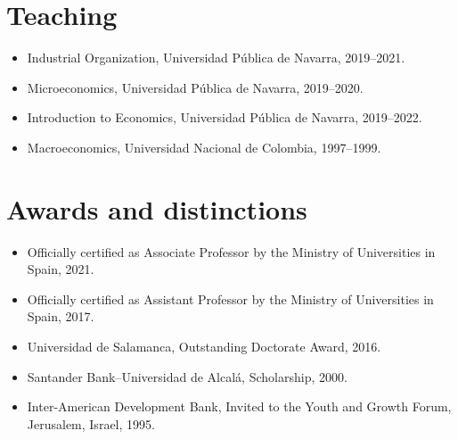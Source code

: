 \documentclass[11pt]{article}\usepackage[]{graphicx}\usepackage[usenames,dvipsnames]{xcolor}
\begin{document}
\section{Teaching} 
\begin{itemize}
  \item Industrial Organization, Universidad Pública de Navarra, 2019--2021.
  \item Microeconomics, Universidad Pública de Navarra, 2019--2020.
  \item Introduction to Economics, Universidad Pública de Navarra, 2019--2022.
  \item Macroeconomics, Universidad Nacional de Colombia, 1997--1999.
\end{itemize}

\section{Awards and distinctions} 
\begin{itemize}
  \item Officially certified as Associate Professor by the Ministry of Universities in Spain, 2021.
  \item Officially certified as Assistant Professor by the Ministry of Universities in Spain, 2017.
  \item Universidad de Salamanca, Outstanding Doctorate Award, 2016.
  \item Santander Bank--Universidad de Alcalá, Scholarship, 2000.
  \item Inter-American Development Bank, Invited to the Youth and Growth Forum, Jerusalem, Israel, 1995.
\end{itemize}
\end{document}
